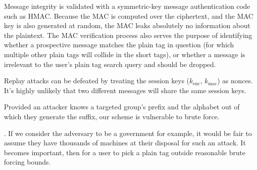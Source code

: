 Message integrity is validated with a symmetric-key message
authentication code such as HMAC. Because the MAC is computed over the
ciphertext, and the MAC key is also generated at random, the MAC leaks
absolutely no information about the plaintext. The MAC verification
process also serves the purpose of identifying whether a prospective
message matches the plain tag in question (for which multiple other
plain tags will collide in the short tags), or whether a message is
irrelevant to the user's plain tag search query and should be dropped.

Replay attacks can be defeated by treating the session keys
($k_{\mathrm{enc}}$, $k_{\mathrm{mac}}$) as nonces. It's highly unlikely
that two different messages will share the same session keys.


%
Provided an attacker knows a targeted group's prefix and the alphabet
out of which they generate the suffix, our scheme is vulnerable to brute
force.

. If we consider the adversary
to be a government for example, it would be fair to assume they have
thousands of machines at their disposal for such an attack. It becomes
important, then for a user to pick a plain tag outside reasonable brute
forcing bounds.


%


